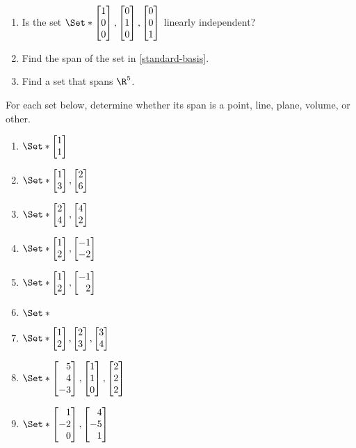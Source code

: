 \begin{exercises}
	\begin{problist}
		\prob
		\begin{enumerate}
		\item Is the set $\Set*{\mat{1\\0\\0},\mat{0\\1\\0},\mat{0\\0\\1}}$ linearly
		independent?
		\label{standard-basis}
		\item Find the span of the set in \ref{standard-basis}.
		\item Find a set that spans $\R^5$.
	\end{enumerate}
		\prob
		For each set below, determine whether its span is a point, line, plane, volume, or other.
		\label{span of set}
		\begin{enumerate}
				\item   $\Set*{\mat{1\\1}}$
				\item   $\Set*{\mat{1\\3},\mat{2\\6}}$
				\item   $\Set*{\mat{2\\4},\mat{4\\2}}$
				\item   $\Set*{\mat{1\\2},\mat{-1\\-2}}$
				\item   $\Set*{\mat{1\\2},\mat{-1\\2}}$
				\item   $\Set*{}$
				\item		$\Set*{\mat{1\\2},\mat{2\\3},\mat{3\\4}}$
				\item   $\Set*{\mat{5\\4\\-3},\mat{1\\1\\0},\mat{2\\2\\2}}$
				\item   $\Set*{\mat{1\\-2\\0},\mat{4\\-5\\1}}$

\end{enumerate}
\end{problist}
\end{exercises}
